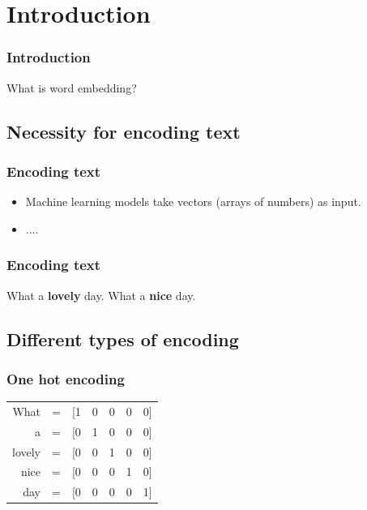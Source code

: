 \section{Introduction}

\begin{frame}
	\frametitle{Introduction}
	
	\begin{center}
		\Huge {What is word embedding?}
	\end{center}
\end{frame}

\subsection{Necessity for encoding text}

\begin{frame}
\frametitle{Encoding text}


	\begin{itemize}
	\item Machine learning models take vectors (arrays of numbers) as input.
	\item ....
\end{itemize}

\end{frame}

\begin{frame}
	\frametitle{Encoding text}
	
	
		\huge {What a \textbf{lovely} day.}
		 \newline
		\huge{What a \textbf{nice} day.}

\end{frame}

\subsection{Different types of encoding}

\begin{frame}
	\frametitle{One hot encoding}
	
\begin{table}[h]
	\hspace{15mm}
	\huge
	\begin{tabular}{rcccccc}
		What & = & [1 & 0 & 0 & 0 & 0] \\
		a & = & [0 &  1 &  0 &  0 & 0] \\
		lovely & = & [0 & 0& 1& 0& 0] \\
		nice & = & [0 &0& 0& 1& 0] \\
		day & = & [0 &0& 0& 0& 1] \\
	\end{tabular}
\end{table}


\end{frame}

